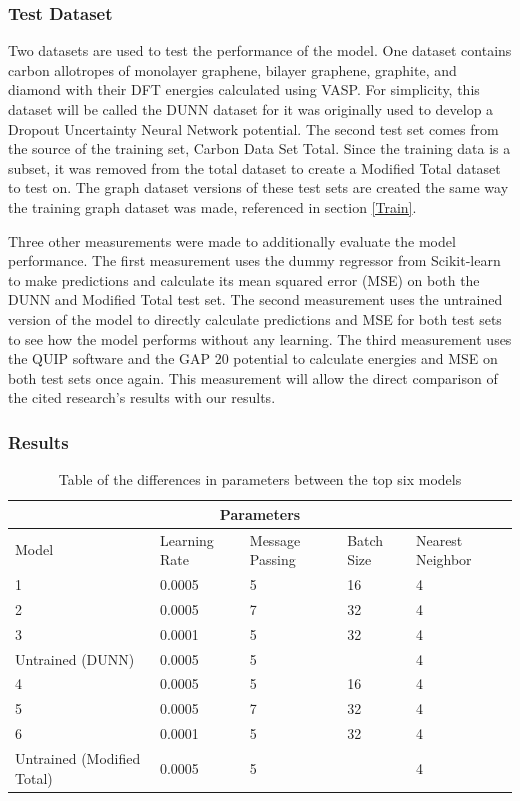\documentclass[12pt, abstract = true]{scrartcl}
\begin{document}
\subsubsection{Test Dataset} 
Two datasets are used to test the performance of the model. One dataset contains carbon allotropes of monolayer graphene, bilayer graphene, graphite, and diamond with their DFT energies calculated using VASP. For simplicity, this dataset will be called the DUNN dataset for it was originally used to develop a Dropout Uncertainty Neural Network potential\cite{dunn}. The second test set comes from the source of the training set, Carbon Data Set Total. Since the training data is a subset, it was removed from the total dataset to create a Modified Total dataset to test on. The graph dataset versions of these test sets are created the same way the training graph dataset was made, referenced in section \ref{Train}. 

Three other measurements were made to additionally evaluate the model performance. The first measurement uses the dummy regressor from Scikit-learn to make predictions and calculate its mean squared error (MSE) on both the DUNN and Modified Total test set. The second measurement uses the untrained version of the model to directly calculate predictions and MSE for both test sets to see how the model performs without any learning. The third measurement uses the QUIP software and the GAP 20 potential\cite{gap20} to calculate energies and MSE on both test sets once again. This measurement will allow the direct comparison of the cited research's results with our results.

\subsubsection{Results} 

\begin{table}
    \centering
    \begin{tabular}{|p{3cm}||p{2cm}|p{2cm}|p{2cm}|p{2cm}|}
    \hline
    \multicolumn{5}{|c|}{Parameters} \\
    \hline
    Model & Learning Rate & Message Passing & Batch Size & Nearest Neighbor\\
    \hline
    1 & 0.0005 & 5 & 16 & 4\\
    2 & 0.0005 & 7 & 32 & 4\\    
    3 & 0.0001 & 5 & 32 & 4\\
    Untrained (DUNN) & 0.0005 & 5 & & 4\\
    4 & 0.0005 & 5 & 16 & 4\\
    5 & 0.0005 & 7 & 32 & 4\\
    6 & 0.0001 & 5 & 32 & 4\\
    Untrained (Modified Total) & 0.0005 & 5 & & 4\\
    \hline
    
    \end{tabular}
    \caption{Table of the differences in parameters between the top six models}\label{tab:param}
\end{table}
\end{document}
